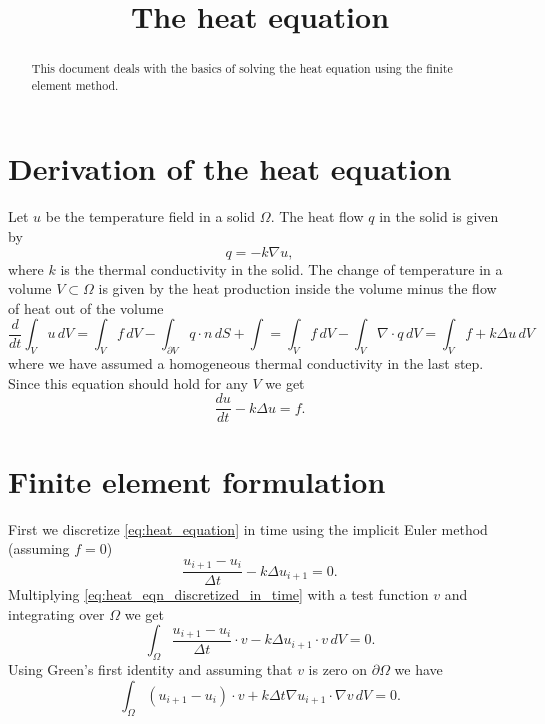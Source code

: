 \documentclass[a4paper,10pt]{article}
\begin{document}
\title{The heat equation}
\maketitle

\begin{abstract}
\noindent
This document deals with the basics of solving the heat equation using the
finite element method.
\end{abstract}

\section{Derivation of the heat equation}
Let $u$ be the temperature field in a solid $\Omega$. The heat flow $q$ in the
solid is given by
\[
q = -k \nabla u,
\]
where $k$ is the thermal conductivity in the solid. The change of temperature
in a volume $V \subset \Omega$ is given by the heat production inside the volume
minus the flow of heat out of the volume
\[
\frac{d}{dt} \int_V u \, dV
= \int_V f \, dV -\int_{\partial V} q \cdot n \, dS + \int
= \int_V f \, dV - \int_V \nabla \cdot q \, dV
= \int_V f + k \Delta u \, dV
\]
where we have assumed a homogeneous thermal conductivity in the last step. Since
this equation should hold for any $V$ we get
\begin{equation} \label{eq:heat_equation}
\frac{du}{dt} - k \Delta u = f.
\end{equation}

\section{Finite element formulation}
First we discretize \eqref{eq:heat_equation} in time using the implicit Euler
method (assuming $f = 0$)
\begin{equation} \label{eq:heat_eqn_discretized_in_time}
\frac{u_{i + 1} - u_i}{\Delta t} - k \Delta u_{i + 1} = 0.
\end{equation}
Multiplying \eqref{eq:heat_eqn_discretized_in_time} with a test function $v$ and
integrating over $\Omega$ we get
\[
\int_{\Omega} \frac{u_{i + 1} - u_i}{\Delta t} \cdot v - k \Delta u_{i + 1} \cdot v \, dV = 0.
\]
Using Green's first identity and assuming that $v$ is zero on $\partial \Omega$
we have
\[
\int_{\Omega} (u_{i + 1} - u_i) \cdot v + k \Delta t \nabla u_{i + 1} \cdot \nabla v \, dV = 0.
\]
\end{document}

